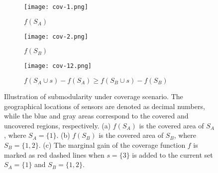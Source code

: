 \begin{figure}
    \centering
    \begin{subfigure}[b]{0.35\textwidth}
        \texttt{[image: cov-1.png]}
        \caption{$f(S_A)$}
    \end{subfigure}
    \begin{subfigure}[b]{0.35\textwidth}
        \texttt{[image: cov-2.png]}
        \caption{$f(S_B)$}
    \end{subfigure}
    \hfill

    \begin{subfigure}[b]{0.8\textwidth}
    \centering
        \texttt{[image: cov-12.png]}
        \caption{$f(S_A \cup s)-f(S_A) \geq f(S_B \cup s)-f(S_B)$ } \label{fig:AB-cov}
    \end{subfigure}

    \caption{Illustration of submodularity under coverage scenario. The geographical locations of sensors are denoted as decimal numbers, while the blue and gray areas correspond to the covered and uncovered regions, respectively. (a) $f(S_A)$ is the covered area of $S_A$, where $S_A=\{1\}$. (b) $f(S_B)$ is the covered area of $S_B$, where $S_B=\{1,2\}$. (c) The marginal gain of the coverage function $f$ is marked as red dashed lines when $s=\{3\}$ is added to the current set $S_A=\{1\}$ and $S_B=\{1,2\}$.
    }
    \label{submodularity}
\end{figure}


